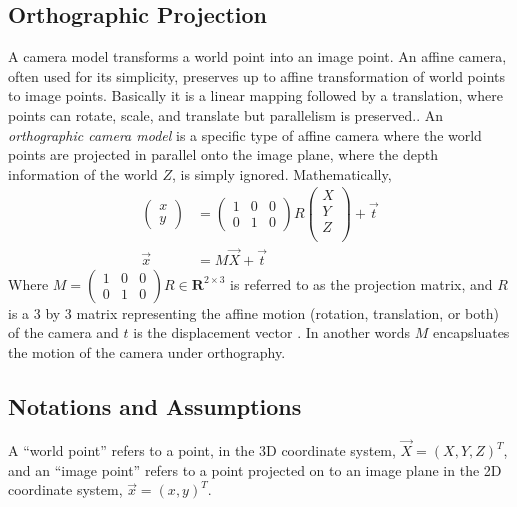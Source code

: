 \subsection{Orthographic Projection}
\label{sec:ortho}
A camera model transforms a world point into an
image point. An affine camera, often used for
its simplicity, preserves up to affine transformation of world points
to image points. Basically it is a linear mapping followed by a translation, where
points can rotate, scale, and translate but parallelism is
preserved.\cite[p.38]{Szelski}. 
An \emph{orthographic
camera model} is a specific type of affine camera where the world
points are projected in parallel onto the image plane, where the depth
information of the world $Z$, is simply ignored. Mathematically, 
\begin{align*}
\begin{pmatrix}
  x\\y
\end{pmatrix} &= \begin{pmatrix}
  1& 0&0 \\0 & 1 & 0
\end{pmatrix}
R
\begin{pmatrix}
  X\\Y\\Z\\
\end{pmatrix} + \vec t\\
\vec x &= M\vec X + \vec t
\end{align*}
Where $M = \begin{pmatrix}
  1& 0&0 \\0 & 1 & 0
\end{pmatrix}R \in \mathbf{R}^{2\times 3}$ is referred to as the projection matrix, and $R$
is a 3 by 3 matrix representing the affine motion (rotation, translation, or
both) of the camera and $t$ is the displacement vector
\cite[p.172]{AZ}. In another words $M$ encapsluates the motion of the
camera under orthography.

\subsection{Notations and Assumptions}
\label{sec:notations}
A ``world point'' refers to a point, in the 3D
coordinate system, $\vec X = (X,Y,Z)^T$, and an ``image point'' refers
to a point projected on to an image plane in the 2D coordinate system,
$\vec x =(x,y)^T$. 

